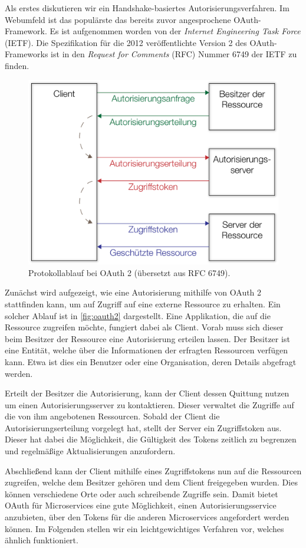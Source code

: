 Als erstes diskutieren wir ein Handshake-basiertes Autorisierungsverfahren. Im Webumfeld ist das populärste das bereits zuvor angesprochene OAuth-Framework. Es ist aufgenommen worden von der \textit{Internet Engineering Task Force} (IETF). Die Spezifikation für die 2012 veröffentlichte Version 2 des OAuth-Frameworks ist in den \textit{Request for Comments} (RFC) Nummer 6749 der IETF zu finden. \cite{RFC6749}

\begin{figure}[h]
	\centering
	\includegraphics[width=.55\linewidth]{img/OAuth2}
	\caption{Protokollablauf bei OAuth 2 (übersetzt aus RFC 6749).}
	\label{fig:oauth2}
\end{figure}

Zunächst wird aufgezeigt, wie eine Autorisierung mithilfe von OAuth 2 stattfinden kann, um auf Zugriff auf eine externe Ressource zu erhalten. Ein solcher Ablauf ist in \autoref{fig:oauth2} dargestellt. Eine Applikation, die auf die Ressource zugreifen möchte, fungiert dabei als Client. Vorab muss sich dieser beim Besitzer der Ressource eine Autorisierung erteilen lassen. Der Besitzer ist eine Entität, welche über die Informationen der erfragten Ressourcen verfügen kann. Etwa ist dies ein Benutzer oder eine Organisation, deren Details abgefragt werden.

Erteilt der Besitzer die Autorisierung, kann der Client dessen Quittung nutzen um einen Autorisierungsserver zu kontaktieren. Dieser verwaltet die Zugriffe auf die von ihm angebotenen Ressourcen. Sobald der Client die Autorisierungserteilung vorgelegt hat, stellt der Server ein Zugriffstoken aus. Dieser hat dabei die Möglichkeit, die Gültigkeit des Tokens zeitlich zu begrenzen und regelmäßige Aktualisierungen anzufordern. 

Abschließend kann der Client mithilfe eines Zugriffstokens nun auf die Ressourcen zugreifen, welche dem Besitzer gehören und dem Client freigegeben wurden. Dies können verschiedene Orte oder auch schreibende Zugriffe sein. Damit bietet OAuth für Microservices eine gute Möglichkeit, einen Autorisierungsservice anzubieten, über den Tokens für die anderen Microservices angefordert werden können. Im Folgenden stellen wir ein leichtgewichtiges Verfahren vor, welches ähnlich funktioniert.


